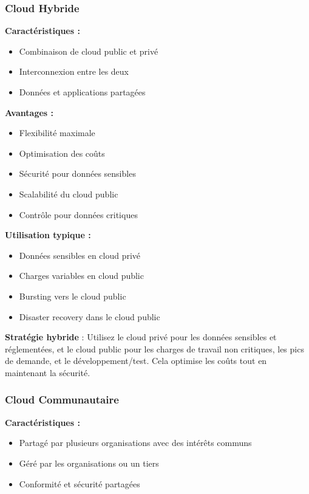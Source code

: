 \documentclass[11pt,a4paper]{article}
\begin{document}
\subsubsection{Cloud Hybride}

\textbf{Caractéristiques :}
\begin{itemize}
    \item Combinaison de cloud public et privé
    \item Interconnexion entre les deux
    \item Données et applications partagées
\end{itemize}

\textbf{Avantages :}
\begin{itemize}
    \item Flexibilité maximale
    \item Optimisation des coûts
    \item Sécurité pour données sensibles
    \item Scalabilité du cloud public
    \item Contrôle pour données critiques
\end{itemize}

\textbf{Utilisation typique :}
\begin{itemize}
    \item Données sensibles en cloud privé
    \item Charges variables en cloud public
    \item Bursting vers le cloud public
    \item Disaster recovery dans le cloud public
\end{itemize}

\begin{tipbox}
\textbf{Stratégie hybride} : Utilisez le cloud privé pour les données sensibles et réglementées, et le cloud public pour les charges de travail non critiques, les pics de demande, et le développement/test. Cela optimise les coûts tout en maintenant la sécurité.
\end{tipbox}

\subsubsection{Cloud Communautaire}

\textbf{Caractéristiques :}
\begin{itemize}
    \item Partagé par plusieurs organisations avec des intérêts communs
    \item Géré par les organisations ou un tiers
    \item Conformité et sécurité partagées
\end{itemize}
\end{document}

